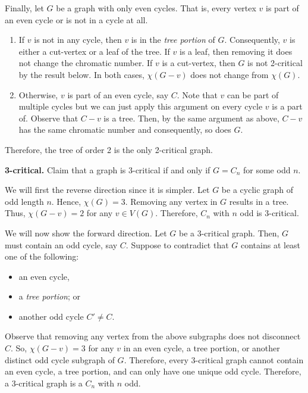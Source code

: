 \begin{enumerate}[label=(\roman*)]
\begin{solution}
        Finally, let \(G\) be a graph with only even cycles. That
        is, every vertex \(v\) is part of an even cycle or is not
        in a cycle at all.
        \begin{enumerate}
          \item If \(v\) is not in any cycle, then \(v\) is in
            the \textit{tree portion} of \(G\). Consequently,
            \(v\) is either a cut-vertex or a leaf of the tree.
            If \(v\) is a leaf, then removing it does not change
            the chromatic number. If \(v\) is a cut-vertex, then
            \(G\) is not 2-critical by the result below. In both
            cases, \(\chi(G - v)\) does not change from
            \(\chi(G)\).

          \item Otherwise, \(v\) is part of an even cycle, say
            \(C\). Note that \(v\) can be part of multiple cycles
            but we can just apply this argument on every cycle
            \(v\) is a part of. Observe that \(C - v\) is a tree.
            Then, by the same argument as above, \(C-v\) has the
            same chromatic number and consequently, so does
            \(G\).
        \end{enumerate}
        Therefore, the tree of order 2 is the only 2-critical
        graph.

        \vspace{5em} 

        \textbf{3-critical.} Claim that a graph is 3-critical
        if and only if \(G = C_n\) for some odd \(n\).

        We will first the reverse direction since it is simpler.
        Let \(G\) be a cyclic graph of odd length \(n\). Hence,
        \(\chi(G) = 3\). Removing any vertex in \(G\) results in
        a tree. Thus, \(\chi(G-v) = 2\) for any \(v \in V(G)\).
        Therefore, \(C_n\) with \(n\) odd is 3-critical.

        We will now show the forward direction. Let \(G\) be a
        3-critical graph. Then, \(G\) must contain an odd cycle,
        say \(C\). Suppose to contradict that \(G\) contains 
        at least one of the following:
        \begin{itemize}
          \item an even cycle,
          \item a \textit{tree portion}; or
          \item another odd cycle \(C' \neq C\). 
        \end{itemize}
        Observe that removing any vertex from the above subgraphs
        does not disconnect \(C\). So, \(\chi(G-v)=3\) for any
        \(v\) in an even cycle, a tree portion, or another distinct
        odd cycle subgraph of \(G\). Therefore, every 3-critical
        graph cannot contain an even cycle, a tree portion, and
        can only have one unique odd cycle. Therefore, a
        3-critical graph is a \(C_n\) with \(n\) odd.
      \end{solution}


\end{enumerate}
